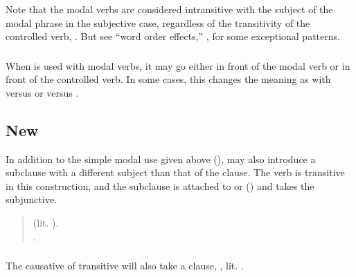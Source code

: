 \subsubsection{} Note that the modal verbs are considered intransitive
with the subject of the modal phrase in the subjective case,
regardless of the transitivity of the controlled verb,  .  But see ``word order
effects,'' , for some
exceptional patterns.

\subsubsection{} When  is used with modal verbs, it may go either in front of the modal verb or in front of the controlled verb.  In some cases, this changes the meaning as with   versus   or   versus  . \label{syn:modal:neg}

\subsection{New} In addition to the simple modal use given above
(),   may also introduce a
subclause with a different subject than that of the  clause.
The verb is transitive in this construction, and the subclause is
attached to  or  () and
takes the subjunctive. \label{syn:modal:new}

\begin{quotation}
\noindent {}  (lit. ). \\
\noindent {} .
\end{quotation}

\subsubsection{} The causative of transitive  will also take a
 clause, 
, lit. . 

